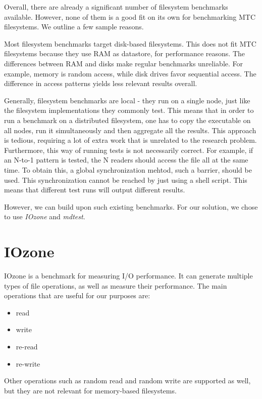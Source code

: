 Overall, there are already a significant number of filesystem benchmarks available\cite{fsbench}. However, none of them is a good fit on its own for benchmarking MTC filesystems. We outline a few sample reasons.

Most filesystem benchmarks target disk-based filesystems. This does not fit MTC filesystems because they use RAM as datastore, for performance reasons. The differences between RAM and disks make regular benchmarks unreliable. For example, memory is random access, while disk drives favor sequential access. The difference in access patterns yields less relevant results overall.

Generally, filesystem benchmarks are local - they run on a single node, just like the filesystem implementations they commonly test. This means that in order to run a benchmark on a distributed filesystem, one has to copy the executable on all nodes, run it simultaneously and then aggregate all the results. This approach is tedious, requiring a lot of extra work that is unrelated to the research problem. Furthermore, this way of running tests is not necessarily correct. For example, if an N-to-1 pattern is tested, the N readers should access the file all at the same time. To obtain this, a global synchronization mehtod, such a barrier, should be used. This synchronization cannot be reached by just using a shell script. This means that different test runs will output different results.

However, we can build upon such existing benchmarks. For our solution, we chose to use \textit{IOzone}\cite{iozone} and \textit{mdtest}\cite{mdtest}.

\section{IOzone}

IOzone is a benchmark for measuring I/O performance. It can generate multiple types of file operations, as well as measure their performance. The main operations that are useful for our purposes are:

\begin{itemize}
\item read
\item write
\item re-read
\item re-write
\end{itemize}

Other operations such as random read and random write are supported as well, but they are not relevant for memory-based filesystems.


